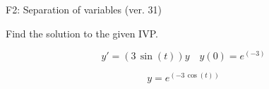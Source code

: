 \begin{exercise}
  \begin{exerciseTitle}F2: Separation of variables (ver. 31)\end{exerciseTitle}
  \begin{exerciseStatement}
    
Find the solution to the given IVP.

    
\[y'=( 3 \, \sin\left(t\right) )y\hspace{1em} y(0)= e^{\left(-3\right)}\]

  \end{exerciseStatement}
  \begin{exerciseAnswer}
    
\[y= e^{\left(-3 \, \cos\left(t\right)\right)}\]

  \end{exerciseAnswer}
\end{exercise}